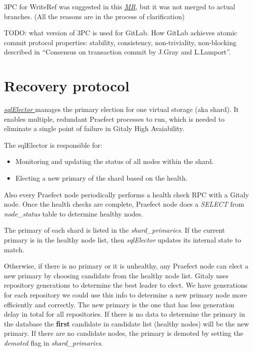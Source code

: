 \documentclass[acmlarge, screen, nonacm]{acmart}
\begin{document}
3PC for WriteRef was suggested in this
\emph{\href{https://gitlab.com/gitlab-org/gitaly/-/issues/2466}{MR}},
but it was not merged to actual branches. (All the reasons are in the process of clarification)

TODO: what version of 3PC is used for GitLab. How GitLab achieves atomic commit protocol properties:
stability, consistency, non-triviality, non-blocking described in
``Consensus on transaction commit by J.Gray and L.Lamport''.

\section{Recovery protocol}


\emph{\href{https://gitlab.com/gitlab-org/gitaly/-/blob/master/internal/praefect/nodes/sql_elector.go}{sqlElector }}manages the primary election for one virtual storage (aka
shard). It enables multiple, redundant Praefect processes to run,
which is needed to eliminate a single point of failure in Gitaly High
Avaiability.

The sqlElector is responsible for:
\begin{itemize}
\item Monitoring and updating the status of all nodes within the shard.
\item Electing a new primary of the shard based on the health.
\end{itemize}
Also every Praefect node periodically performs a health check RPC with a Gitaly node.  Once the health checks are complete, 
Praefect node does a \textit{SELECT} from \textit{node\_status} table to determine healthy nodes.

The primary of each shard is listed in the
\textit{shard\_primaries}. If the current primary is in the healthy
node list, then \textit{sqlElector} updates its internal state to match.

Otherwise, if there is no primary or it is unhealthy, any Praefect node
can elect a new primary by choosing candidate from the healthy node
list. Gitaly uses repository generations to determine the best leader to elect.  
We have generations for each repository we could use this info to determine a new primary node more efficiently and correctly. 
The new primary is the one that has less generation delay in total for all repositories. If there is no data to determine the 
primary in the database the \textbf{first} candidate in candidate list (healthy nodes) will be the new primary.
If there are no candidate nodes, the primary is demoted by setting the \textit{demoted} flag in \textit{shard\_primaries}.
\end{document}
